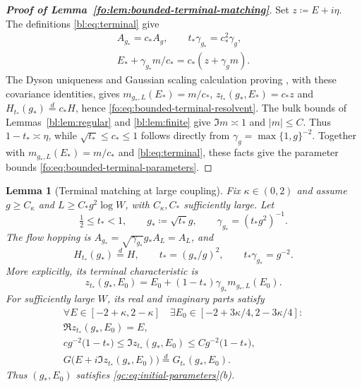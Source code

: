 \documentclass[11pt]{article}
\numberwithin{equation}{section}
\newtheorem{lemma}[theorem]{Lemma}
\theoremstyle{remark}
\begin{document}
\begin{proof}[\textbf{Proof of Lemma~\ref{fo:lem:bounded-terminal-matching}}]
Set $z\coloneqq E+i\eta$. The definitions \eqref{bl:eq:terminal} give
\[
 \begin{gathered}
 A_{g_*}=c_*A_g,\qquad t_*\gamma_{g_*}=c_*^2\gamma_g,\\
 E_*+\gamma_{g_*}m/c_*=c_*(z+\gamma_gm).
 \end{gathered}
\]
The Dyson uniqueness and Gaussian scaling calculation proving
\cite[Lemma~3.3, (3.11)--(3.13)]{TYY}, with these covariance identities,
gives $m_{g_*,L}(E_*)=m/c_*$, $z_{t_*}(g_*,E_*)=c_*z$ and
$H_{t_*}(g_*)\stackrel d=c_*H$, hence
\eqref{fo:eq:bounded-terminal-resolvent}.
The bulk bounds of Lemmas~\ref{bl:lem:regular} and
\ref{bl:lem:finite} give $\Im m\asymp1$ and $|m|\le C$.
Thus $1-t_*\asymp\eta$, while
$\sqrt{t_*}\le c_*\le1$ follows directly from
$\gamma_g=\max\{1,g\}^{-2}$. Together with
$m_{g_*,L}(E_*)=m/c_*$ and \eqref{bl:eq:terminal}, these facts give
the parameter bounds \eqref{fo:eq:bounded-terminal-parameters}.
\end{proof}

\begin{lemma}[Terminal matching at large coupling]\label{fo:lem:matching}
Fix $\kappa\in(0,2)$ and assume $g\ge C_\kappa$ and
$L\ge C_*g^2\log W$, with $C_\kappa,C_*$ sufficiently large. Let
\[
 \tfrac12\le t_*<1,\qquad
 g_*\coloneqq\sqrt{t_*}g,\qquad
 \gamma_{g_*}=(t_*g^2)^{-1}.
\]
The flow hopping is $A_{g_*}=\sqrt{\gamma_{g_*}}g_*A_L=A_L$, and
\begin{equation}\label{fo:eq:large-matching}
 H_{t_*}(g_*)\stackrel d=H,\qquad
 t_*=(g_*/g)^2,\qquad t_*\gamma_{g_*}=g^{-2}.
\end{equation}
More explicitly, its terminal characteristic is
\[
 z_{t_*}(g_*,E_0)
       =E_0+(1-t_*)\gamma_{g_*}m_{g_*,L}(E_0).
\]
For sufficiently large $W$, its real and imaginary parts satisfy
\begin{equation}\label{fo:eq:large-match-domain}
 \begin{gathered}
 \forall E\in[-2+\kappa,2-\kappa]\quad
 \exists E_0\in[-2+3\kappa/4,2-3\kappa/4]:\\
 \Re z_{t_*}(g_*,E_0)=E,\\
 cg^{-2}\bigl(1-t_*\bigr)\le
       \Im z_{t_*}(g_*,E_0)
       \le Cg^{-2}\bigl(1-t_*\bigr),\\
 G\bigl(E+i\Im z_{t_*}(g_*,E_0)\bigr)
       \stackrel d=G_{t_*}(g_*,E_0).
 \end{gathered}
\end{equation}
Thus $(g_*,E_0)$ satisfies \eqref{gc:eq:initial-parameters}(b).
\end{lemma}
\end{document}
